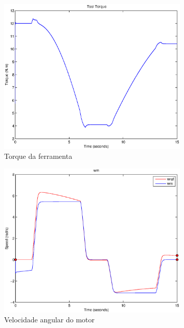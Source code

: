 \documentclass{article}
\begin{document}
\begin{figure}[H]
\begin{subfigure}{0.32\textwidth}
		\includegraphics[width=\linewidth]{matlab/t5}
		\caption{Torque da ferramenta}
	\end{subfigure}
	\begin{subfigure}{0.32\textwidth}
		\includegraphics[width=\linewidth]{matlab/wm5}
		\caption{Velocidade angular do motor}
	\end{subfigure}
	\begin{subfigure}{0.32\textwidth}

\end{subfigure}
\end{figure}
\end{document}
